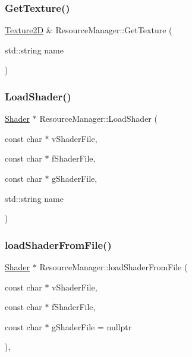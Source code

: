 \subsubsection{\texorpdfstring{Get\+Texture()}{GetTexture()}}
{\footnotesize\ttfamily \hyperlink{classTexture2D}{Texture2D} \& Resource\+Manager\+::\+Get\+Texture (\begin{DoxyParamCaption}\item[{std\+::string}]{name }\end{DoxyParamCaption})\hspace{0.3cm}{\ttfamily [static]}}

\mbox{\label{classResourceManager_a241bb97b7dfaf9939fd644ac9fbdd5b4}} 
\subsubsection{\texorpdfstring{Load\+Shader()}{LoadShader()}}
{\footnotesize\ttfamily \hyperlink{classShader}{Shader} $\ast$ Resource\+Manager\+::\+Load\+Shader (\begin{DoxyParamCaption}\item[{const char $\ast$}]{v\+Shader\+File,  }\item[{const char $\ast$}]{f\+Shader\+File,  }\item[{const char $\ast$}]{g\+Shader\+File,  }\item[{std\+::string}]{name }\end{DoxyParamCaption})\hspace{0.3cm}{\ttfamily [static]}}

\mbox{\label{classResourceManager_aeceee147638d827ca8b88a3dba259cb8}} 
\subsubsection{\texorpdfstring{load\+Shader\+From\+File()}{loadShaderFromFile()}}
{\footnotesize\ttfamily \hyperlink{classShader}{Shader} $\ast$ Resource\+Manager\+::load\+Shader\+From\+File (\begin{DoxyParamCaption}\item[{const char $\ast$}]{v\+Shader\+File,  }\item[{const char $\ast$}]{f\+Shader\+File,  }\item[{const char $\ast$}]{g\+Shader\+File = {\ttfamily nullptr} }\end{DoxyParamCaption})\hspace{0.3cm}{\ttfamily [static]}, {\ttfamily [private]}}

